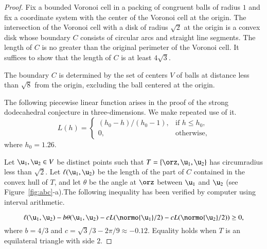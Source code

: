 \documentclass{llncs}
\begin{document}
\begin{proof} Fix a bounded Voronoi cell in a packing of congruent
  balls of radius $1$ and fix a coordinate system with the center of
  the Voronoi cell at the origin.  The intersection of the Voronoi
  cell with a disk of radius $\sqrt2$ at the origin is a convex disk
  whose boundary $C$ consists of circular arcs and straight line
  segments.  The length of $C$ is no greater than the original
  perimeter of the Voronoi cell.  It suffices to show that the length
  of $C$ is at least $4\sqrt{3}$.



The boundary $C$ is determined by the set of centers $V$ of balls at
distance less than $\sqrt8$ from the origin, excluding the ball
centered at the origin.

The following piecewise linear function arises in the proof of the strong dodecahedral
conjecture in three-dimensions.  We make repeated use of it.
\begin{equation}
L(h) = \begin{cases} 
   (h_0-h)/(h_0-1),& \text{if } h \le h_0,\\
  0,&\text{otherwise},
 \end{cases}
\end{equation}
where $h_0 = 1.26$. 

Let $\u_1,\u_2\in V$ be distinct points such that
$T=\{\orz,\u_1,\u_2\}$ has circumradius less than $\sqrt2$.  Let
$\ell(\u_1,\u_2)$ be the length of the part of $C$ contained in the
convex hull of $T$, and let $\theta$ be the angle at $\orz$ between
$\u_1$ and $\u_2$ (see Figure~\ref{fig:abc}-a).The following inequality has been verified by
computer using interval arithmetic.





\begin{equation}\label{eqn:ineq} %
\ell(\u_1,\u_2) - b \theta(\u_1,\u_2) - 
c L(\normo{\u_1}/2) - c L(\normo{\u_2}/2)) \ge 0,
\end{equation}
where $b=4/3$ and $c=\sqrt3/3 - 2\pi/9 \approx -0.12$.
Equality holds when $T$ is an equilateral triangle with side $2$.


\end{proof}
\end{document}
